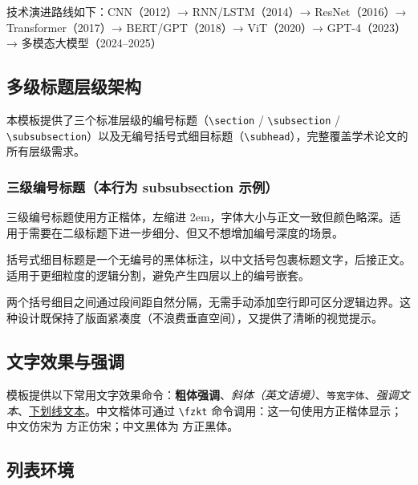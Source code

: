 \documentclass{harryopo-paper}
\begin{document}
{技术演进路线如下：CNN（2012）→ RNN/LSTM（2014）→ ResNet（2016）→ Transformer（2017）→ BERT/GPT（2018）→ ViT（2020）→ GPT-4（2023）→ 多模态大模型（2024--2025）}

\subsection{多级标题层级架构}

本模板提供了三个标准层级的编号标题（\verb|\section| / \verb|\subsection| / \verb|\subsubsection|）以及无编号括号式细目标题（\verb|\subhead|），完整覆盖学术论文的所有层级需求。

\subsubsection{三级编号标题（本行为 subsubsection 示例）}

三级编号标题使用方正楷体，左缩进 2em，字体大小与正文一致但颜色略深。适用于需要在二级标题下进一步细分、但又不想增加编号深度的场景。


括号式细目标题是一个无编号的黑体标注，以中文括号包裹标题文字，后接正文。适用于更细粒度的逻辑分割，避免产生四层以上的编号嵌套。

两个括号细目之间通过段间距自然分隔，无需手动添加空行即可区分逻辑边界。这种设计既保持了版面紧凑度（不浪费垂直空间），又提供了清晰的视觉提示。

\subsection{文字效果与强调}

模板提供以下常用文字效果命令：\textbf{粗体强调}、\textit{斜体（英文语境）}、\texttt{等宽字体}、\emph{强调文本}、\underline{下划线文本}。中文楷体可通过 \verb|\fzkt| 命令调用：{\fzkt 这一句使用方正楷体显示}；中文仿宋为 {\fzfs 方正仿宋}；中文黑体为 {\fzht 方正黑体}。

\subsection{列表环境}
\end{document}
